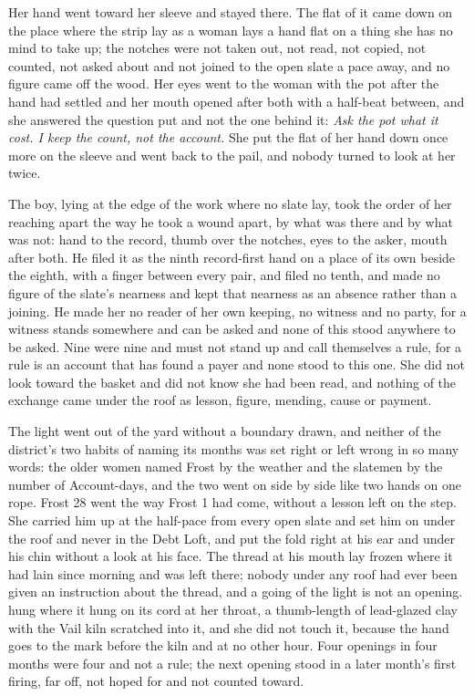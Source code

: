 Her hand went toward her sleeve and stayed there. The flat of it came down on the place where the strip lay as a woman lays a hand flat on a thing she has no mind to take up; the notches were not taken out, not read, not copied, not counted, not asked about and not joined to the open slate a pace away, and no figure came off the wood. Her eyes went to the woman with the pot after the hand had settled and her mouth opened after both with a half-beat between, and she answered the question put and not the one behind it: \emph{Ask the pot what it cost. I keep the count, not the account.} She put the flat of her hand down once more on the sleeve and went back to the pail, and nobody turned to look at her twice.

The boy, lying at the edge of the work where no slate lay, took the order of her reaching apart the way he took a wound apart, by what was there and by what was not: hand to the record, thumb over the notches, eyes to the asker, mouth after both. He filed it as the ninth record-first hand on a place of its own beside the eighth, with a finger between every pair, and filed no tenth, and made no figure of the slate's nearness and kept that nearness as an absence rather than a joining. He made her no reader of her own keeping, no witness and no party, for a witness stands somewhere and can be asked and none of this stood anywhere to be asked. Nine were nine and must not stand up and call themselves a rule, for a rule is an account that has found a payer and none stood to this one. She did not look toward the basket and did not know she had been read, and nothing of the exchange came under the roof as lesson, figure, mending, cause or payment.

The light went out of the yard without a boundary drawn, and neither of the district's two habits of naming its months was set right or left wrong in so many words: the older women named Frost by the weather and the slatemen by the number of Account-days, and the two went on side by side like two hands on one rope. Frost 28 went the way Frost 1 had come, without a lesson left on the step. She carried him up at the half-pace from every open slate and set him on  under the roof and never in the Debt Loft, and put the fold right at his ear and under his chin without a look at his face. The thread at his mouth lay frozen where it had lain since morning and was left there; nobody under any roof had ever been given an instruction about the thread, and a going of the light is not an opening.  hung where it hung on its cord at her throat, a thumb-length of lead-glazed clay with the Vail kiln scratched into it, and she did not touch it, because the hand goes to the mark before the kiln and at no other hour. Four openings in four months were four and not a rule; the next opening stood in a later month's first firing, far off, not hoped for and not counted toward.

